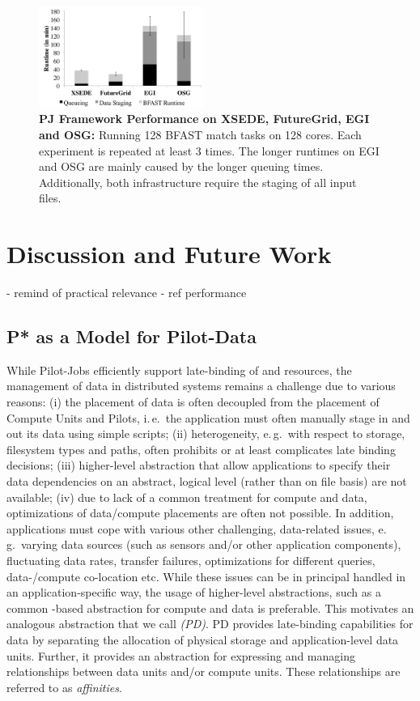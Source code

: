 \documentclass{sig-alternate}
\begin{document}
\begin{figure}[t]
\centering
\includegraphics[width=0.48\textwidth]{perf/interop/128-bfast-egi-fg-xsede-osg.pdf}
\caption{\textbf{PJ Framework Performance on XSEDE, FutureGrid, EGI and 
  OSG:} Running 128 BFAST match tasks on 128 cores. Each experiment is
  repeated at least 3 times. The longer runtimes on EGI and OSG are
  mainly caused by the longer queuing times. Additionally, 
	both infrastructure require the staging of all input files. }
	\label{fig:perf_perf-bfast-bj}
\end{figure}


\section{Discussion and Future Work} 
\label{sec:discussion-future-work}
- remind of practical relevance
- ref performance 

\subsection*{P* as a Model for Pilot-Data}
\label{sec:pilot-data}

While Pilot-Jobs efficiently support late-binding of \computeunits and
resources, the management of data in distributed systems remains a
challenge due to various reasons: (i) the placement of data is often
decoupled from the placement of Compute Units and Pilots, i.\,e.\ the
application must often manually stage in and out its data using simple
scripts; (ii) heterogeneity, e.\,g.\ with respect to storage,
filesystem types and paths, often prohibits or at least complicates
late binding decisions; (iii) higher-level abstraction that allow
applications to specify their data dependencies on an abstract,
logical level (rather than on file basis) are not available; (iv) due
to lack of a common treatment for compute and data, optimizations of
data/compute placements are often not possible.  In addition,
applications must cope with various other challenging, data-related
issues, e.\,g.\ varying data sources (such as sensors and/or other
application components), fluctuating data rates, transfer failures,
optimizations for different queries, data-/compute co-location
etc. While these issues can be in principal handled in an
application-specific way, the usage of higher-level abstractions, such
as a common \pilot-based abstraction for compute and data is
preferable.  This motivates an analogous abstraction that we call
\emph{\pilotdata (PD)}. PD provides late-binding capabilities for data
by separating the allocation of physical storage and application-level
data units. Further, it provides an abstraction for expressing and
managing relationships between data units and/or compute units. These
relationships are referred to as \emph{affinities}.
\end{document}
